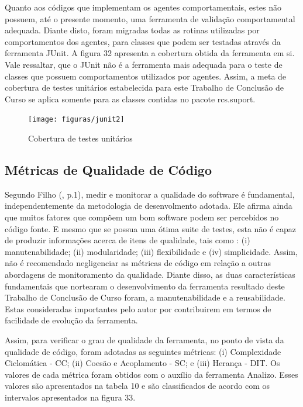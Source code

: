 Quanto aos códigos que implementam os agentes comportamentais, estes não possuem, até o presente momento, uma ferramenta de validação comportamental adequada. Diante disto, foram migradas todas as rotinas utilizadas por comportamentos dos agentes, para classes que podem ser testadas através da ferramenta JUnit. A figura 32 apresenta a cobertura obtida da ferramenta em si. Vale ressaltar, que o JUnit não é a ferramenta mais adequada para o teste de classes que possuem comportamentos utilizados por agentes. Assim, a meta de cobertura de testes unitários estabelecida para este Trabalho de Conclusão de Curso se aplica somente para as classes contidas no pacote rcs.suport.

\begin{figure}[h]
\centering
\label{f22}
\texttt{[image: figuras/junit2]}
\caption{Cobertura de testes unitários}

\end{figure}
\FloatBarrier


\subsection{Métricas de Qualidade de Código}

Segundo Filho (\citeyear{filho2013}, p.1), medir e monitorar a qualidade do software é fundamental, independentemente da metodologia de desenvolmento adotada. Ele afirma ainda que muitos fatores que compõem um bom software podem ser percebidos no código fonte. E mesmo que se possua uma ótima suite de testes, esta não é capaz de produzir informações acerca de itens de qualidade, tais como : (i) manutenabilidade; (ii) modularidade; (iii) flexibilidade e (iv) simplicidade. Assim, não é recomendado negligenciar as métricas de código em relação a outras abordagens de monitoramento da qualidade. Diante disso, as duas características fundamentais que nortearam o desenvolvimento da ferramenta resultado deste Trabalho de Conclusão de Curso foram, a manutenabilidade e a reusabilidade. Estas consideradas importantes pelo autor por contribuirem em termos de facilidade de evolução da ferramenta. 

Assim, para verificar o grau de qualidade da ferramenta, no ponto de vista da qualidade de código, foram adotadas as seguintes métricas: (i) Complexidade Ciclomática - CC; (ii)  Coesão e Acoplamento  - SC; e (iii) Herança - DIT. Os valores de cada métrica foram obtidos com o auxílio da ferramenta Analizo. Esses valores são apresentados na tabela 10 e são classificados de acordo com os intervalos apresentados na figura 33.

